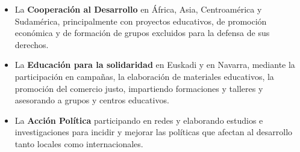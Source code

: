 \begin{itemize}
	\item La \textbf{Cooperación al Desarrollo} en África, Asia, Centroamérica y Sudamérica, principalmente con proyectos educativos, de promoción económica y de formación de grupos excluidos para la defensa de sus derechos.

	\item La \textbf{Educación para la solidaridad} en Euskadi y en Navarra, mediante la participación en campañas, la elaboración de materiales educativos, la promoción del comercio justo, impartiendo formaciones y talleres y asesorando a grupos y centros educativos.

	\item La \textbf{Acción Política} participando en redes y elaborando estudios e investigaciones para incidir y mejorar las políticas que afectan al desarrollo tanto locales como internacionales.


\end{itemize}
